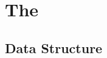 \section{The \sketchname}
\label{sec:algorithm}


\subsection{Data Structure} 
\label{subsec:alg:structure}